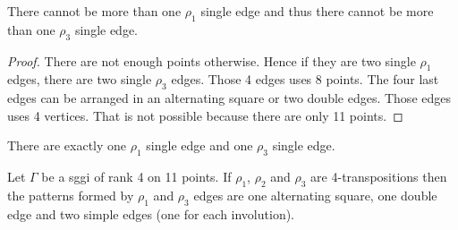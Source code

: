 \begin{lemma}
  There cannot be more than one $\rho_1$ single edge and thus there cannot be more than one $\rho_3$ single edge.
\end{lemma}

\begin{proof}
  There are not enough points otherwise. Hence if they are two single $\rho_1$ edges, there are two single $\rho_3$ edges. Those 4 edges uses 8 points. The four last edges can be arranged in an alternating square or two double edges. Those edges uses 4 vertices. That is not possible because there are only 11 points.
\end{proof}

\begin{corollary}
  \label{rank-4-single-1}
  There are exactly one $\rho_1$ single edge and one $\rho_3$ single edge.
\end{corollary}

\begin{lemma}
  \label{rank-4-3-patterns}
  Let $\Gamma$ be a sggi of rank 4 on 11 points. If $\rho_1$, $\rho_2$ and $\rho_3$ are 4-transpositions then the patterns formed by $\rho_1$ and $\rho_3$ edges are one alternating square, one double edge and two simple edges (one for each involution).
\end{lemma}

